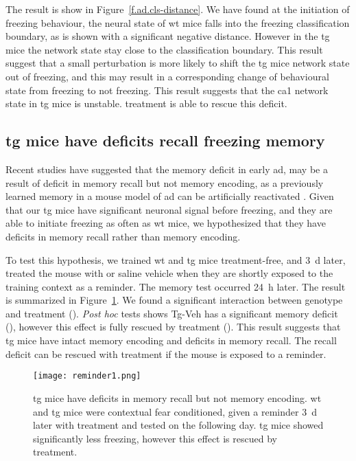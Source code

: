 The result is show in Figure~\ref{f.ad.cls-distance}. We have found at the initiation of freezing behaviour, the neural state of \gls{wt} mice falls into the freezing classification boundary, as is shown with a significant negative distance. However in the \gls{tg} mice the network state stay close to the classification boundary. This result suggest that a small perturbation is more likely to shift the \gls{tg} mice network state out of freezing, and this may result in a corresponding change of behavioural state from freezing to not freezing. This result suggests that the \gls{ca1} network state in \gls{tg} mice is unstable. \tglu{} treatment is able to rescue this deficit. 

\subsection{\Gls{tg} mice have deficits recall freezing memory}

Recent studies have suggested that the memory deficit in early \gls{ad}, may be a result of deficit in memory recall but not memory encoding, as a previously learned memory in a mouse model of \gls{ad} can be artificially reactivated \citep{roy16}. Given that our \gls{tg} mice have significant neuronal signal before freezing, and they are able to initiate freezing as often as \gls{wt} mice, we hypothesized that they have deficits in memory recall rather than memory encoding. 

To test this hypothesis, we trained \gls{wt} and \gls{tg} mice treatment-free, and \SI{3}{\day} later, treated the mouse with \tglu{} or saline vehicle when they are shortly exposed to the training context as a reminder. The memory test occurred \SI{24}{\hour} later. The result is summarized in Figure~\ref{f.ad.reminder1}. We found a significant interaction between genotype and treatment (). \textit{Post hoc} tests shows Tg-Veh has a significant memory deficit (), however this effect is fully rescued by \tglu{} treatment (). This result suggests that \gls{tg} mice have intact memory encoding and deficits in memory recall. The recall deficit can be rescued with \tglu{} treatment if the mouse is exposed to a reminder.

\begin{figure}[h]
    \texttt{[image: reminder1.png]}
    \caption[\tglu{} treatment during a brief reminder rescues memory recall deficit.]{\gls{tg} mice have deficits in memory recall but not memory encoding. \gls{wt} and \gls{tg} mice were contextual fear conditioned, given a reminder \SI{3}{\day} later with treatment and tested on the following day. \gls{tg} mice showed significantly less freezing, however this effect is rescued by \tglu{} treatment. \label{f.ad.reminder1}}
\end{figure}

